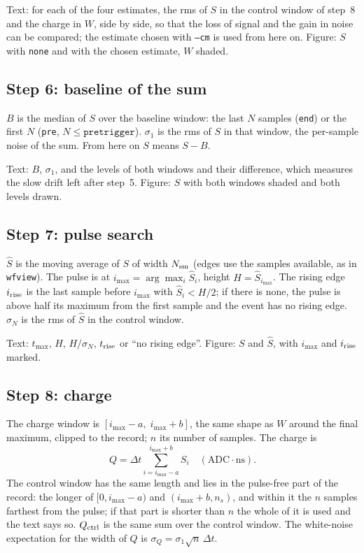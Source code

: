 \documentclass[11pt]{article}
\newcommand{\code}[1]{\texttt{#1}}
\begin{document}
Text: for each of the four estimates, the rms of $S$ in the control
window of step~8 and the charge in $W$, side by side, so that the loss of
signal and the gain in noise can be compared; the estimate chosen with
\code{--cm} is used from here on. Figure: $S$ with \code{none} and with
the chosen estimate, $W$ shaded.

\subsection{Step 6: baseline of the sum}

$B$ is the median of $S$ over the baseline window: the last $N$ samples
(\code{end}) or the first $N$ (\code{pre}, $N \le \code{pretrigger}$).
$\sigma_1$ is the rms of $S$ in that window, the per-sample noise of the
sum. From here on $S$ means $S - B$.

Text: $B$, $\sigma_1$, and the levels of both windows and their
difference, which measures the slow drift left after step~5. Figure: $S$
with both windows shaded and both levels drawn.

\subsection{Step 7: pulse search}

$\hat S$ is the moving average of $S$ of width $N_{\rm sm}$ (edges use the
samples available, as in \code{wfview}). The pulse is at $i_{\max} =
\arg\max_i \hat S_i$, height $H = \hat S_{i_{\max}}$. The rising edge
$i_{\rm rise}$ is the last sample before $i_{\max}$ with $\hat S_i < H/2$;
if there is none, the pulse is above half its maximum from the first
sample and the event has no rising edge. $\sigma_N$ is the rms of $\hat S$
in the control window.

Text: $t_{\max}$, $H$, $H/\sigma_N$, $t_{\rm rise}$ or ``no rising edge''.
Figure: $S$ and $\hat S$, with $i_{\max}$ and $i_{\rm rise}$ marked.

\subsection{Step 8: charge}

The charge window is $[i_{\max} - a,\; i_{\max} + b]$, the same shape as
$W$ around the final maximum, clipped to the record; $n$ its number of
samples. The charge is
\[
  Q = \Delta t \sum_{i = i_{\max}-a}^{i_{\max}+b} S_i \quad (\text{ADC}\cdot\text{ns}).
\]
The control window has the same length and lies in the pulse-free part of
the record: the longer of $[0, i_{\max}-a)$ and $(i_{\max}+b, n_s)$, and
within it the $n$ samples farthest from the pulse; if that part is shorter
than $n$ the whole of it is used and the text says so. $Q_{\rm ctrl}$ is
the same sum over the control window. The white-noise expectation for the
width of $Q$ is $\sigma_Q = \sigma_1 \sqrt{n}\,\Delta t$.
\end{document}
